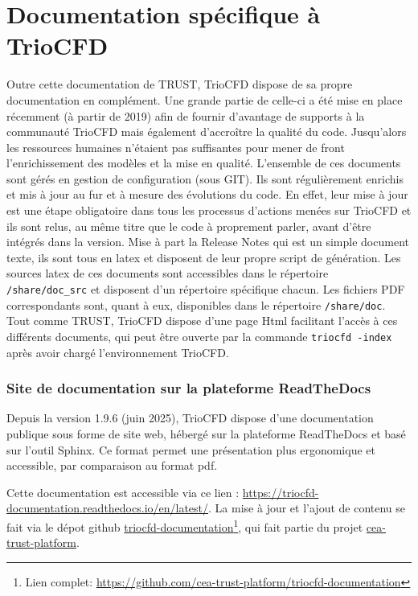 \chapter{\label{chapitre:doc-trio}Documentation spécifique à TrioCFD}
Outre cette documentation de TRUST, TrioCFD dispose de sa propre documentation en complément. Une grande partie de celle-ci a été mise en place récemment (à partir de 2019) afin de fournir d'avantage de supports à la communauté TrioCFD mais également d'accroître la qualité du code. Jusqu'alors les ressources humaines n'étaient pas suffisantes pour mener de front l'enrichissement des modèles et la mise en qualité. L'ensemble de ces documents sont gérés en gestion de configuration (sous GIT). Ils sont régulièrement enrichis et mis à jour au fur et à mesure des évolutions du code. En effet, leur mise à jour est une étape obligatoire dans tous les processus d'actions menées sur TrioCFD et ils sont relus, au même titre que le code à proprement parler, avant d'être intégrés dans la version. Mise à part la Release Notes qui est un simple document texte, ils sont tous en latex et disposent de leur propre script de génération. Les sources latex de ces documents sont accessibles dans le répertoire \texttt{/share/doc\_src} et disposent d'un répertoire spécifique chacun. Les fichiers PDF correspondants sont, quant à eux, disponibles dans le répertoire \texttt{/share/doc}. Tout comme TRUST, TrioCFD dispose d'une page Html facilitant l'accès à ces différents documents, qui peut être ouverte par la commande \texttt{triocfd -index} après avoir chargé l'environnement TrioCFD.

\subsection{Site de documentation sur la plateforme ReadTheDocs}

Depuis la version 1.9.6 (juin 2025), TrioCFD dispose d'une documentation publique sous forme de site web, hébergé sur la plateforme ReadTheDocs et basé sur l'outil Sphinx. Ce format permet une présentation plus ergonomique et accessible, par comparaison au format pdf.

Cette documentation est accessible via ce lien : \url{https://triocfd-documentation.readthedocs.io/en/latest/}.
La mise à jour et l'ajout de contenu se fait via le dépot github \href{https://github.com/cea-trust-platform/triocfd-documentation}{triocfd-documentation}\footnote{Lien complet: \url{https://github.com/cea-trust-platform/triocfd-documentation}}, qui fait partie du projet \href{https://github.com/cea-trust-platform}{cea-trust-platform}.

